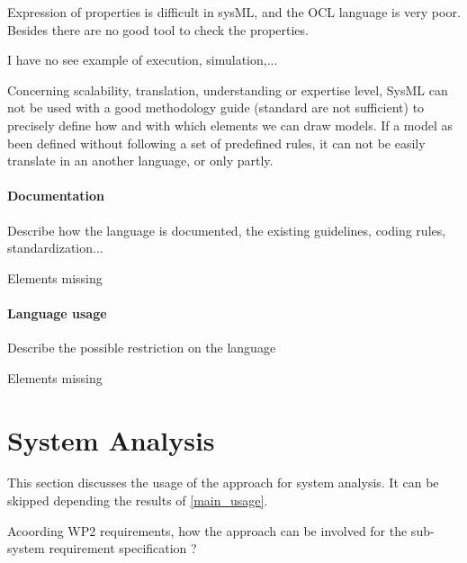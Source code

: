 \begin{assessor2}
Expression of properties is difficult in sysML, and the OCL language is very poor. Besides there are no good tool to check the properties. 

I have no see example of execution, simulation,...

Concerning scalability, translation, understanding or expertise level, SysML can not be used with a good methodology guide (standard are not sufficient)  to  precisely define how and with which elements we can draw models. If a model as been defined without following a set of predefined rules, it can not be easily translate in an another language, or only  partly.
\end{assessor2}

\paragraph{Documentation} Describe how the language is documented, the existing guidelines, coding rules, standardization...


\begin{assessor2}
Elements missing
\end{assessor2}


\paragraph{Language usage} Describe the possible restriction on the language


\begin{assessor2}
Elements missing
\end{assessor2}



\section{System Analysis}
This section discusses the usage of the approach for system analysis.
It can be skipped depending the results of \ref{main_usage}.

Acoording WP2 requirements, how the approach can be involved for the sub-system requirement specification ?

